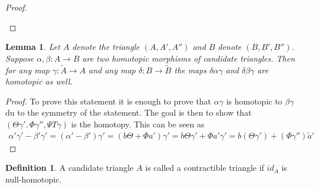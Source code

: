 \documentclass[12pt]{article}
\newtheorem{lemma}[theorem]{Lemma}
\theoremstyle{definition}
\newtheorem{definition}{Definition}[section]
\theoremstyle{remark}
\begin{document}
\begin{proof}
\begin{center}
                \end{center}
            \end{proof}

            \begin{lemma}
                Let $A$ denote the triangle $(A,A',A'')$ and $B$ denote $(B,B',B'')$. Suppose $\alpha, \beta : A \rightarrow B$ are two homotopic morphisms of candidate triangles. Then for any map $\gamma : \widetilde{A} \rightarrow A$ and any map $\delta : B \rightarrow \widetilde{B}$ the maps $\delta\alpha\gamma$ and $\delta\beta\gamma$ are homotopic as well.
            \end{lemma}

            \begin{proof}
                To prove this statement it is enough to prove that $\alpha\gamma$ is homotopic to $\beta\gamma$ du to the symmetry of the statement. The goal is then to show that $(\Theta\gamma ',\Phi\gamma '',\Psi T\gamma)$ is the homotopy. This can be seen as
                \begin{multline*}
                    {\alpha}'{\gamma}'-{\beta}'{\gamma}' = ({\alpha}'-{\beta}'){\gamma}' = (b\Theta +\Phi a'){\gamma}' = b\Theta {\gamma}' + \Phi a'{\gamma}' = b({\Theta}{\gamma}') + ({\Phi}{\gamma}'')\widetilde{a}'
                \end{multline*}
            \end{proof}

            \begin{definition}
                A candidate triangle $A$ is called a contractible triangle if $id_A$ is null-homotopic.
            \end{definition}
\end{document}
